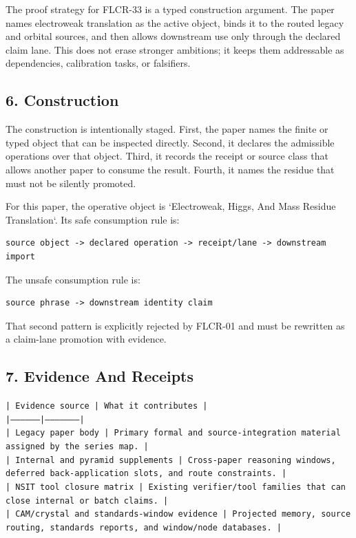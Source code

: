 \documentclass[11pt]{article}
\begin{document}
The proof strategy for FLCR-33 is a typed construction argument. The paper names electroweak translation as the active object, binds it to the routed legacy and orbital sources, and then allows downstream use only through the declared claim lane. This does not erase stronger ambitions; it keeps them addressable as dependencies, calibration tasks, or falsifiers.

\subsection*{6. Construction}

The construction is intentionally staged. First, the paper names the finite or
typed object that can be inspected directly. Second, it declares the admissible
operations over that object. Third, it records the receipt or source class that
allows another paper to consume the result. Fourth, it names the residue that
must not be silently promoted.

For this paper, the operative object is `Electroweak, Higgs, And Mass Residue Translation`. Its safe consumption
rule is:

\begin{verbatim}
source object -> declared operation -> receipt/lane -> downstream import
\end{verbatim}

The unsafe consumption rule is:

\begin{verbatim}
source phrase -> downstream identity claim
\end{verbatim}

That second pattern is explicitly rejected by FLCR-01 and must be rewritten as
a claim-lane promotion with evidence.

\subsection*{7. Evidence And Receipts}

\noindent\texttt{| Evidence source | What it contributes |}\\
\noindent\texttt{|-----------------|---------------------|}\\
\noindent\texttt{| Legacy paper body | Primary formal and source-integration material assigned by the series map. |}\\
\noindent\texttt{| Internal and pyramid supplements | Cross-paper reasoning windows, deferred back-application slots, and route constraints. |}\\
\noindent\texttt{| NSIT tool closure matrix | Existing verifier/tool families that can close internal or batch claims. |}\\
\noindent\texttt{| CAM/crystal and standards-window evidence | Projected memory, source routing, standards reports, and window/node databases. |}\\
\end{document}
